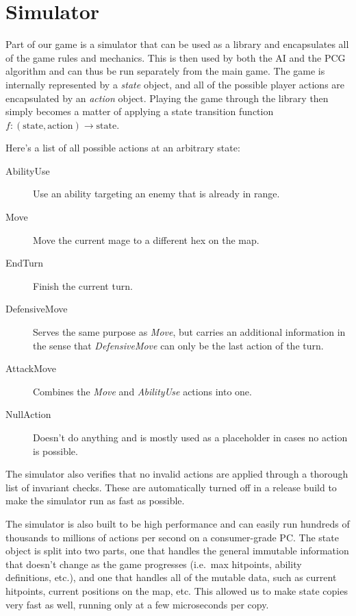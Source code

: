 \section{Simulator}

Part of our game is a simulator that can be used as a library and encapsulates
all of the game rules and mechanics. This is then used by both the AI and the
PCG algorithm and can thus be run separately from the main game. The game is
internally represented by a \emph{state} object, and all of the possible player
actions are encapsulated by an \emph{action} object.  Playing the game through
the library then simply becomes a matter of applying a state transition
function $f: (\text{state}, \text{action}) \rightarrow \text{state}$.

Here's a list of all possible actions at an arbitrary state:

\begin{description}
\item [AbilityUse] Use an ability targeting an enemy that is already in range.
\item [Move] Move the current mage to a different hex on the map.
\item [EndTurn] Finish the current turn.
\item [DefensiveMove] Serves the same purpose as \emph{Move}, but carries an
additional information in the sense that \emph{DefensiveMove} can only be
the last action of the turn.
\item [AttackMove] Combines the \emph{Move} and \emph{AbilityUse} actions into one.
\item [NullAction] Doesn't do anything and is mostly used as a placeholder in cases no action is possible.
\end{description}

The simulator also verifies that no invalid actions are applied through a
thorough list of invariant checks. These are automatically turned off in a
release build to make the simulator run as fast as possible.

The simulator is also built to be high performance and can easily run hundreds
of thousands to millions of actions per second on a consumer-grade PC\@.
The state object is split into two parts, one that handles the
general immutable information that doesn't change as the game progresses (i.e.\
max hitpoints, ability definitions, etc.), and one that handles all of the
mutable data, such as current hitpoints, current positions on the map, etc.
This allowed us to make state copies very fast as well, running only at a few
microseconds per copy.

